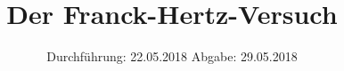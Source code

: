 

\subject{Versuch 601}
\title{Der Franck-Hertz-Versuch}
\date{%
  Durchführung: 22.05.2018
  \hspace{3em}
  Abgabe: 29.05.2018
}



\maketitle
\thispagestyle{empty}
\tableofcontents
\newpage






\printbibliography{}


